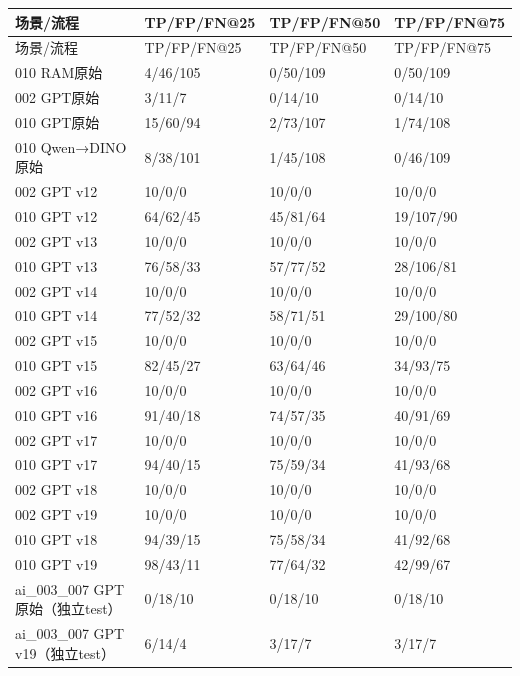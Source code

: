 \documentclass[UTF8,fontset=fandol]{ctexart}
\begin{document}
{\small
\begin{longtable}{|p{}|p{}|p{}|p{}|}
\hline
场景/流程 & TP/FP/FN@25 & TP/FP/FN@50 & TP/FP/FN@75 \\ \hline
\endfirsthead
\hline
场景/流程 & TP/FP/FN@25 & TP/FP/FN@50 & TP/FP/FN@75 \\ \hline
\endhead
010 RAM原始 & 4/46/105 & 0/50/109 & 0/50/109 \\ \hline
002 GPT原始 & 3/11/7 & 0/14/10 & 0/14/10 \\ \hline
010 GPT原始 & 15/60/94 & 2/73/107 & 1/74/108 \\ \hline
010 Qwen→DINO原始 & 8/38/101 & 1/45/108 & 0/46/109 \\ \hline
002 GPT v12 & 10/0/0 & 10/0/0 & 10/0/0 \\ \hline
010 GPT v12 & 64/62/45 & 45/81/64 & 19/107/90 \\ \hline
002 GPT v13 & 10/0/0 & 10/0/0 & 10/0/0 \\ \hline
010 GPT v13 & 76/58/33 & 57/77/52 & 28/106/81 \\ \hline
002 GPT v14 & 10/0/0 & 10/0/0 & 10/0/0 \\ \hline
010 GPT v14 & 77/52/32 & 58/71/51 & 29/100/80 \\ \hline
002 GPT v15 & 10/0/0 & 10/0/0 & 10/0/0 \\ \hline
010 GPT v15 & 82/45/27 & 63/64/46 & 34/93/75 \\ \hline
002 GPT v16 & 10/0/0 & 10/0/0 & 10/0/0 \\ \hline
010 GPT v16 & 91/40/18 & 74/57/35 & 40/91/69 \\ \hline
002 GPT v17 & 10/0/0 & 10/0/0 & 10/0/0 \\ \hline
010 GPT v17 & 94/40/15 & 75/59/34 & 41/93/68 \\ \hline
002 GPT v18 & 10/0/0 & 10/0/0 & 10/0/0 \\ \hline
002 GPT v19 & 10/0/0 & 10/0/0 & 10/0/0 \\ \hline
010 GPT v18 & 94/39/15 & 75/58/34 & 41/92/68 \\ \hline
010 GPT v19 & 98/43/11 & 77/64/32 & 42/99/67 \\ \hline
ai\_003\_007 GPT原始（独立test） & 0/18/10 & 0/18/10 & 0/18/10 \\ \hline
ai\_003\_007 GPT v19（独立test） & 6/14/4 & 3/17/7 & 3/17/7 \\ \hline
\end{longtable}
}
\end{document}
